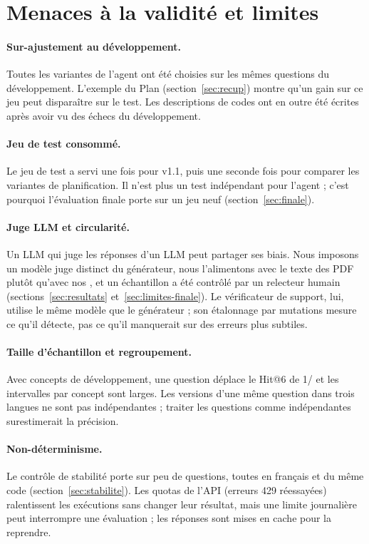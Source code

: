 \section{Menaces à la validité et limites}\label{sec:menaces}

\paragraph{Sur-ajustement au développement.} Toutes les variantes de l'agent ont été choisies sur les mêmes \NQDev{}
questions du développement. L'exemple du Plan (section~\ref{sec:recup}) montre qu'un gain sur ce jeu peut disparaître sur
le test. Les descriptions de codes ont en outre été écrites après avoir vu des échecs du développement.

\paragraph{Jeu de test consommé.} Le jeu de test a servi une fois pour v1.1, puis une seconde fois pour comparer les
variantes de planification. Il n'est plus un test indépendant pour l'agent ; c'est pourquoi l'évaluation finale porte sur un
jeu neuf (section~\ref{sec:finale}).

\paragraph{Juge LLM et circularité.} Un LLM qui juge les réponses d'un LLM peut partager ses biais. Nous imposons un modèle
juge distinct du générateur, nous l'alimentons avec le texte des PDF plutôt qu'avec nos , et un échantillon a été
contrôlé par un relecteur humain (sections~\ref{sec:resultats} et~\ref{sec:limites-finale}). Le vérificateur de support, lui, utilise le même modèle que le
générateur ; son étalonnage par mutations mesure ce qu'il détecte, pas ce qu'il manquerait sur des erreurs plus subtiles.

\paragraph{Taille d'échantillon et regroupement.} Avec \NConceptsDev{} concepts de développement, une question déplace le
Hit@6 de 1/\NQDev{} et les intervalles par concept sont larges. Les versions d'une même question dans trois langues ne sont
pas indépendantes ; traiter les questions comme indépendantes surestimerait la précision.

\paragraph{Non-déterminisme.} Le contrôle de stabilité porte sur peu de questions, toutes en français et du même code
(section~\ref{sec:stabilite}). Les quotas de l'API (erreurs 429 réessayées) ralentissent les exécutions sans changer leur
résultat, mais une limite journalière peut interrompre une évaluation ; les réponses sont mises en cache pour la reprendre.

